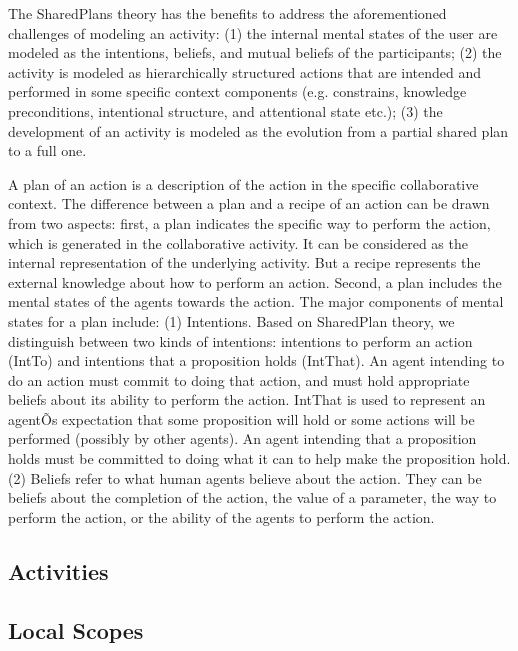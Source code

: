 The SharedPlans theory has the benefits to address the aforementioned challenges of modeling an activity:  (1) the internal mental states of the user are modeled as the intentions, beliefs, and mutual beliefs of the participants; (2) the activity is modeled as hierarchically structured actions that are intended and performed in some specific context components (e.g. constrains, knowledge preconditions, intentional structure, and attentional state etc.); (3) the development of an activity is modeled as the evolution from a partial shared plan to a full one. 

A plan of an action is a description of the action in the specific collaborative context. The difference between a plan and a recipe of an action can be drawn from two aspects: first, a plan indicates the specific way to perform the action, which is generated in the collaborative activity. It can be considered as the internal representation of the underlying activity. But a recipe represents the external knowledge about how to perform an action. Second, a plan includes the mental states of the agents towards the action. The major components of mental states for a plan include: (1) Intentions. Based on SharedPlan theory, we distinguish between two kinds of intentions: intentions to perform an action (IntTo) and intentions that a proposition holds (IntThat). An agent intending to do an action must commit to doing that action, and must hold appropriate beliefs about its ability to perform the action. IntThat is used to represent an agentÕs expectation that some proposition will hold or some actions will be performed (possibly by other agents). An agent intending that a proposition holds must be committed to doing what it can to help make the proposition hold. (2) Beliefs refer to what human agents believe about the action. They can be beliefs about the completion of the action, the value of a parameter, the way to perform the action, or the ability of the agents to perform the action.

\subsection{Activities} %
\label{sub:activities}


\subsection{Local Scopes} %
\label{sub:local_scopes}

